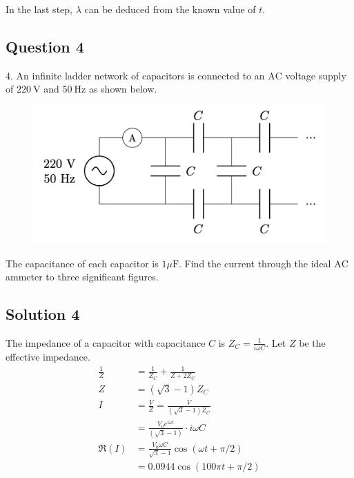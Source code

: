 \documentclass{article}
\begin{document}
In the last step, $\lambda$ can be deduced from the known value of $t$. 

\pagebreak

\subsection{Question 4}
4. An infinite ladder network of capacitors is connected to an $\mathrm{AC}$ voltage supply of $220 \mathrm{~V}$ and $50 \mathrm{~Hz}$ as shown below.
\begin{figure}
	\centering
	\includegraphics[width=0.5\linewidth]{spho_book_TYS_images/2017q4.png}
	\caption{}
\end{figure}
The capacitance of each capacitor is $1 \mu \mathrm{F}$. Find the current through the ideal $\mathrm{AC}$ ammeter to three significant figures.

\subsection{Solution 4}
The impedance of a capacitor with capacitance $C$ is $Z_C = \frac{1}{i\omega C}$. Let $Z$ be the effective impedance. 
\begin{align}
    \frac{1}{Z} &= \frac{1}{Z_C} + \frac{1}{Z+2Z_C} \\
    Z &= (\sqrt{3}-1) Z_C \\
    I &= \frac{V}{Z} = \frac{V}{(\sqrt{3}-1) Z_C} \\
    &=  \frac{V_0 e^{i\omega t}}{(\sqrt{3}-1)}\cdot i\omega C \\
    \Re(I) &= \frac{V_0 \omega C}{\sqrt{3}-1} \cos(\omega t + \pi/2) \\
    &= 0.0944 \cos (100\pi t + \pi/2)
\end{align}
\pagebreak
\end{document}
